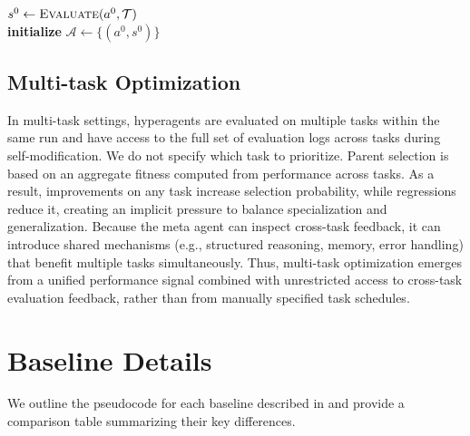 \documentclass[]{fairmeta}
\begin{document}
\begin{algorithm}[H]
\DontPrintSemicolon
\SetAlgoLined
{}
\BlankLine
$s^{0} \leftarrow \textsc{Evaluate}(a^{0}, \mathcal{T})$ \\
\textbf{initialize} $\mathcal{A} \leftarrow \{(a^{0}, s^{0})\}$ 
\caption{Open-ended Hyperagent Machine (OHM)}
\label{alg:ohm}
\end{algorithm}

\subsection{Multi-task Optimization}
\label{app:multi-task}

In multi-task settings, hyperagents are evaluated on multiple tasks within the same run and have access to the full set of evaluation logs across tasks during self-modification. We do not specify which task to prioritize. Parent selection is based on an aggregate fitness computed from performance across tasks. As a result, improvements on any task increase selection probability, while regressions reduce it, creating an implicit pressure to balance specialization and generalization. Because the meta agent can inspect cross-task feedback, it can introduce shared mechanisms (e.g., structured reasoning, memory, error handling) that benefit multiple tasks simultaneously. Thus, multi-task optimization emerges from a unified performance signal combined with unrestricted access to cross-task evaluation feedback, rather than from manually specified task schedules.

\section{Baseline Details}
\label{app:baseline-details}

We outline the pseudocode for each baseline described in  and provide a comparison table summarizing their key differences.
\end{document}
